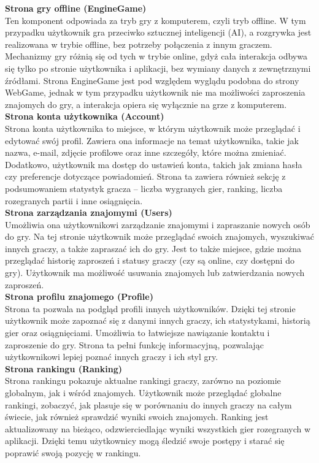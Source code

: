 \documentclass[12pt,a4paper]{article}
\begin{document}
\textbf{Strona gry offline (EngineGame)}\\
Ten komponent odpowiada za tryb gry z komputerem, czyli tryb offline. W tym przypadku użytkownik gra przeciwko sztucznej inteligencji (AI), a rozgrywka jest realizowana w trybie offline, bez potrzeby połączenia z innym graczem. Mechanizmy gry różnią się od tych w trybie online, gdyż cała interakcja odbywa się tylko po stronie użytkownika i aplikacji, bez wymiany danych z zewnętrznymi źródłami. Strona EngineGame jest pod względem wyglądu podobna do strony WebGame, jednak w tym przypadku użytkownik nie ma możliwości zaproszenia znajomych do gry, a interakcja opiera się wyłącznie na grze z komputerem.
\\

\textbf{Strona konta użytkownika (Account)}\\
Strona konta użytkownika to miejsce, w którym użytkownik może przeglądać i edytować swój profil. Zawiera ona informacje na temat użytkownika, takie jak nazwa, e-mail, zdjęcie profilowe oraz inne szczegóły, które można zmieniać. Dodatkowo, użytkownik ma dostęp do ustawień konta, takich jak zmiana hasła czy preferencje dotyczące powiadomień. Strona ta zawiera również sekcję z podsumowaniem statystyk gracza – liczba wygranych gier, ranking, liczba rozegranych partii i inne osiągnięcia.
\\

\textbf{Strona zarządzania znajomymi (Users)}\\
Umożliwia ona użytkownikowi zarządzanie znajomymi i zapraszanie nowych osób do gry. Na tej stronie użytkownik może przeglądać swoich znajomych, wyszukiwać innych graczy, a także zapraszać ich do gry. Jest to także miejsce, gdzie można przeglądać historię zaproszeń i statusy graczy (czy są online, czy dostępni do gry). Użytkownik ma możliwość usuwania znajomych lub zatwierdzania nowych zaproszeń.
\\

\textbf{Strona profilu znajomego (Profile)}\\
Strona ta pozwala na podgląd profili innych użytkowników. Dzięki tej stronie użytkownik może zapoznać się z danymi innych graczy, ich statystykami, historią gier oraz osiągnięciami. Umożliwia to łatwiejsze nawiązanie kontaktu i zaproszenie do gry. Strona ta pełni funkcję informacyjną, pozwalając użytkownikowi lepiej poznać innych graczy i ich styl gry.
\\

\textbf{Strona rankingu (Ranking)}\\
Strona rankingu pokazuje aktualne rankingi graczy, zarówno na poziomie globalnym, jak i wśród znajomych. Użytkownik może przeglądać globalne rankingi, zobaczyć, jak plasuje się w porównaniu do innych graczy na całym świecie, jak również sprawdzić wyniki swoich znajomych. Ranking jest aktualizowany na bieżąco, odzwierciedlając wyniki wszystkich gier rozegranych w aplikacji. Dzięki temu użytkownicy mogą śledzić swoje postępy i starać się poprawić swoją pozycję w rankingu.
\\
\end{document}
